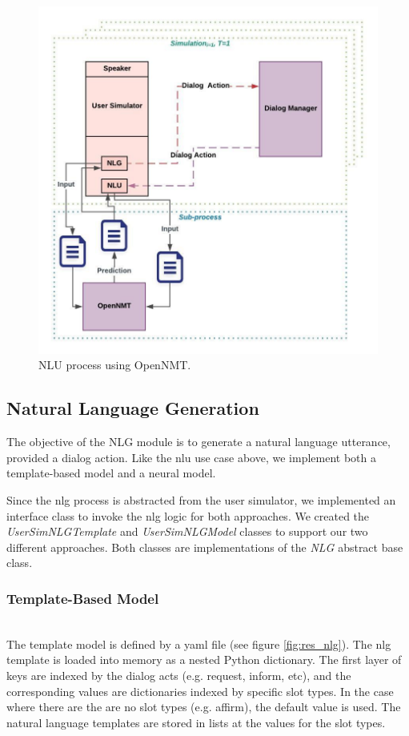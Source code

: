 \begin{figure}[h!]
	\centering
	\includegraphics[scale=.65]{diagrams/open_nmt.jpeg}
	\caption{ NLU process using OpenNMT. }
	\label{fig:open_nmt_model}
\end{figure}


\subsection{Natural Language Generation}

The objective of the NLG module is to generate a natural language utterance, provided a dialog action. Like the nlu use case above, we implement both a template-based model and a neural model. 

Since the nlg process is abstracted from the user simulator, we implemented an interface class to invoke the nlg logic for both approaches. We created the \textit{UserSimNLGTemplate} and \textit{UserSimNLGModel} classes to support our two different approaches. Both classes are implementations of the \textit{NLG} abstract base class.


\subsubsection{Template-Based Model}
~ \\ 
The template model is defined by a yaml file (see figure \ref{fig:res_nlg}). The nlg template is loaded into memory as a nested Python dictionary. The first layer of keys are indexed by the dialog acts (e.g. request, inform, etc), and the corresponding values are dictionaries indexed by specific slot types. In the case where there are the are no slot types (e.g. affirm), the default value is used. The natural language templates are stored in lists at the values for the slot types.

